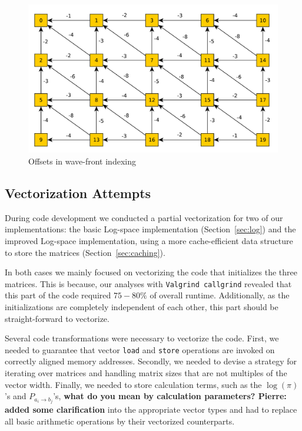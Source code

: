 \documentclass[runningheads,a4paper]{llncs}
\begin{document}
\begin{figure}
\centering
\includegraphics[scale=0.5]{images/unnamed0.pdf}
\caption{Offsets in wave-front indexing}
\label{fig:offset}
\end{figure}


\subsection{Vectorization Attempts}
\label{sec:vector}
During code development we conducted a partial vectorization for two of our implementations: 
the basic Log-space implementation (Section~\ref{sec:log}) and the improved Log-space implementation, using a more 
cache-efficient data structure to store the matrices (Section~\ref{sec:caching}).

In both cases we mainly focused on vectorizing the code that initializes the three matrices. 
This is because, our analyses with \texttt{Valgrind callgrind} revealed that this 
part of the code required $75-80\%$ of overall runtime. 
Additionally, as the initializations are completely independent of each other, this part should be straight-forward to vectorize.

Several code transformations were necessary to vectorize the code. 
First, we needed to guarantee that vector \texttt{load} and \texttt{store} operations are invoked on correctly aligned memory addresses. 
Secondly, we needed to devise a strategy for iterating over matrices and handling matrix sizes that are not multiples of the vector width.
Finally, we needed to store calculation terms, such as the $\log(\pi)$'s and $P_{a_i \to b_j}$'s, {\bf what do you mean by calculation parameters? Pierre: added some clarification} into the appropriate vector types and 
had to replace all basic arithmetic operations by their vectorized counterparts.
\end{document}
